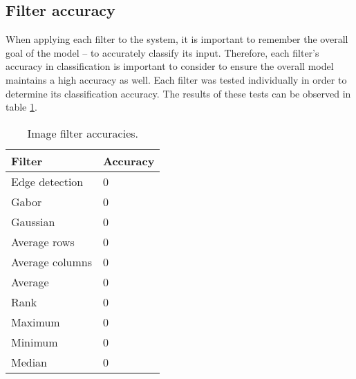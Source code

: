 	\subsection{Filter accuracy} \label{s:filters:accuracy}
		When applying each filter to the system, it is important to remember the overall goal of the model -- to accurately classify its input. Therefore, each filter's accuracy in classification is important to consider to ensure the overall model maintains a high accuracy as well. Each filter was tested individually in order to determine its classification accuracy. The results of these tests can be observed in table \ref{t:filterAccuracies}.
		\begin{table}
			\begin{center}
				\caption{Image filter accuracies.}
				\label{t:filterAccuracies}
				\begin{tabular}{l|l}\hline
					\textbf{Filter} & \textbf{Accuracy}\\\hline
					Edge detection & 0\\\hline
					Gabor & 0\\\hline
					Gaussian & 0\\\hline
					Average rows & 0\\\hline
					Average columns & 0\\\hline
					Average & 0\\\hline
					Rank & 0\\\hline
					Maximum & 0\\\hline
					Minimum & 0\\\hline
					Median & 0\\\hline
				\end{tabular}
			\end{center}
		\end{table}
